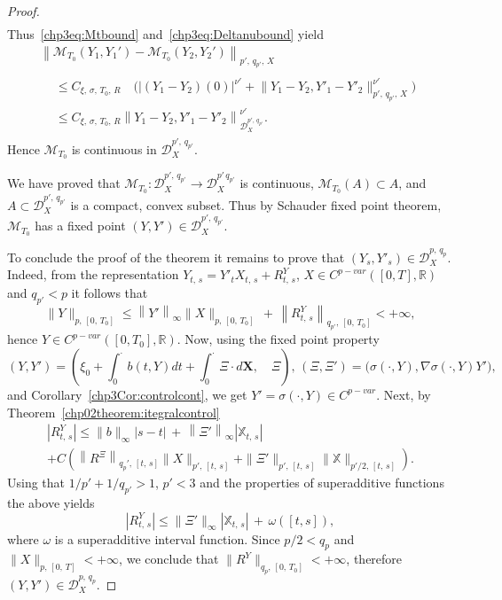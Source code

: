 \documentclass[10pt]{amsart}
\theoremstyle{definition}\newtheorem{defi}[theo]{Definition}\newtheorem{rema}[theo]{Remark}\newtheorem{exam}[theo]{Example}\newtheorem{exem}[theo]{Example}\newtheorem{nota}[theo]{Notation}
\newcommand{\scrD}{\mathscr{D}}
\newcommand{\bbX}{\mathbb{X}}
\newcommand{\calM}{\mathcal{M}}
\newcommand{\Rr}{{\mathbb{R}}}
\begin{document}
\begin{proof}
\begin{multline*}
\end{multline*}
Thus~\eqref{chp3eq:Mtbound} and~\eqref{chp3eq:Deltanubound} yield
\begin{multline*}
\left\|\calM_{T_0}\left(Y_1,Y_1'\right)-\calM_{T_0}\left(Y_2,Y_2'\right)\right\|_{p',\, q_{p'}, \,X}\\
\begin{aligned}
&\leq C_{\xi,\,\sigma,\,T_0,\,R}\quad \Big(\left|\left(Y_1-Y_2\right)(0)\right|^{\nu'}+\big\|Y_1-Y_2,Y'_1-Y'_2\big\|^{\nu'}_{p',\,q_{p'}, \,X}\Big)\\
&\leq C_{\xi,\,\sigma,\,T_0,\,R} \left\|Y_1-Y_2,Y'_1-Y'_2\right\|^{\nu'}_{\scrD^{p', \,q_{p'}}_ X}.
\end{aligned}
\end{multline*}
Hence $\calM_{T_0}$ is continuous in $\scrD^{p',\,q_{p'}}_{X}$.

We have proved that $\calM_{T_0}\colon \scrD^{p', \,q_{p'}}_{X}\to \scrD^{p'\,q_{p'}}_{X}$ is continuous, $\calM_{T_0}(A)\subset A$, and $A\subset \scrD^{p',\,q_{p'}}_{X}$ is a compact, convex subset. Thus by Schauder fixed point theorem, $\calM_{T_0}$ has a fixed point $(Y,Y')\in\scrD^{p',\,q_{p'}}_{X}$.

To conclude the proof of the theorem it remains to prove that $(Y_s,Y'_s)\in\scrD^{p,\,q_p}_{X}$. Indeed, from the representation $Y_{t,\,s}=Y'_tX_{t,\,s}+R^Y_{t,\,s}$, $X\in C^{p-var}([0,T],\Rr)$ and $q_{p'}<p$ it follows that
\[
\|Y\|_{p,\,\left[0,\,T_0\right]}\leq \left\|Y'\right\|_{\infty} \|X\|_{p,\,\left[0,\,T_0\right]}\,+\,\left\|R^Y_{t,\,s}\right\|_{q_{p'},\,\left[0,\,T_0\right]}<+\infty,
\]
hence $Y\in C^{p-var}([0,T_0],\Rr)$. Now, using the fixed point property
\[
\left(Y,Y'\right)=\left(\xi_0+\int_0^{\cdot} b(t, Y)dt+\int_0^{\cdot} \Xi\cdot d\bm{X},\quad \Xi\right),\, \left(\Xi,\Xi'\right)=\big(\sigma(\cdot,Y), \nabla \sigma(\cdot,Y) Y'\big),
\]
and Corollary~\ref{chp3Cor:controlcont}, we get $Y'=\sigma(\cdot, Y)\in C^{p-var}$. Next, by Theorem~\ref{chp02theorem:itegralcontrol}
\begin{multline*}
\left|R^Y_{t,\,s}\right|
\leq \|b\|_{\infty}|s-t|\,+\,\left\|\Xi'\right\|_{\infty}\left|\bbX_{t,\,s}\right|\\
+ C\left(\left\|{R}^{\Xi}\right\|_{q_p',\,[t,\,s]}\|X\|_{p',\,[t,\,s]}+\|\Xi'\|_{p',\,[t,\,s]}\|{\bbX}\|_{p'/2,\,[t,\,s]}\right).
\end{multline*}
Using that $1/p'+1/q_{p'}>1$, $p'<3$ and the properties of superadditive functions the above yields
\[
\left|R^Y_{t,\,s}\right|\leq \|\Xi'\|_{\infty}|\bbX_{t,\,s}|\,+\,\omega([t,s]),
\]
where $\omega$ is a superadditive interval function. Since $p/2< q_{p}$ and $\|X\|_{p,\,[0,\,T]}<+\infty$, we conclude that $\|R^Y\|_{q_p,\, [0,\,T_0]}<+\infty$, therefore $(Y,Y')\in\scrD^{p,\,q_p}_{X }.$
\end{proof}
\end{document}
